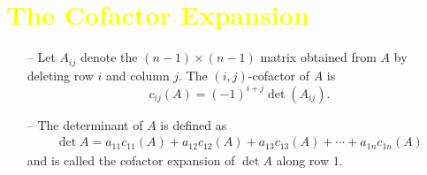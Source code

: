 \documentclass[pdf,9pt]{beamer}
\begin{document}
\section[\textcolor{yellow}{}]{\textcolor{yellow}{The Cofactor Expansion}}
\begin{frame}[fragile]
    \begin{definition}[continued]
    \begin{itemize}
	\item[--] Let $A_{ij}$ denote the $(n-1)\times(n-1)$ matrix obtained from
	$A$ by deleting \alert{row $i$} and \alert{column $j$}. The \alert{$(i,j)$-cofactor} of $A$ is
	\[ c_{ij}(A)=(-1)^{i+j}\det(A_{ij}).\]
    \end{itemize}
    \vfill
    \begin{itemize}
	\item[--] \alert{The determinant of $A$} is defined as
	    \begin{align*}
		\det A = a_{11}c_{11}(A) + a_{12}c_{12}(A) + a_{13}c_{13}(A) + \cdots + a_{1n}c_{1n}(A)
	    \end{align*}
	and is called the \alert{cofactor expansion of $\det A$ along
	row $1$}.
    \end{itemize}
\end{definition}

\end{frame}
\end{document}
